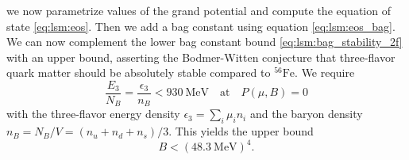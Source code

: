 we now parametrize values of the grand potential and compute the equation of state \eqref{eq:lsm:eos}.
Then we add a bag constant using equation \eqref{eq:lsm:eos_bag}.
We can now complement the lower bag constant bound \eqref{eq:lsm:bag_stability_2f} with an upper bound,
asserting the Bodmer-Witten conjecture that three-flavor quark matter should be absolutely stable compared to $^{56}\text{Fe}$.
We require
\begin{equation}
	\frac{E_3}{N_B} = \frac{\epsilon_3}{n_B} < \SI{930}{\mega\electronvolt}
	\quad \text{at} \quad
	P(\mu,B) = 0
\end{equation}
with the three-flavor energy density $\epsilon_3 = \sum_i \mu_i n_i$ and the baryon density $n_B = N_B / V = (n_u+n_d+n_s)/3$.
This yields the upper bound
\begin{equation}
	B < (\SI{48.3}{\mega\electronvolt})^4 .
\end{equation}


